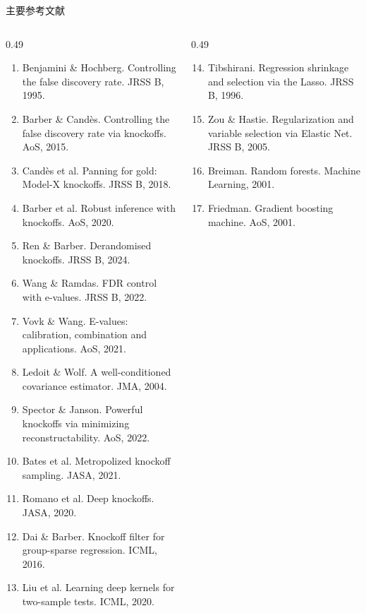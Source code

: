 \documentclass[aspectratio=169]{beamer}
\begin{document}
\begin{frame}[shrink=22]{主要参考文献}
  \tiny
  \begin{columns}[T]
    \begin{column}{0.49\textwidth}
      \begin{enumerate}
        \item Benjamini \& Hochberg. Controlling the false discovery rate. JRSS B, 1995.
        \item Barber \& Candès. Controlling the false discovery rate via knockoffs. AoS, 2015.
        \item Candès et al. Panning for gold: Model-X knockoffs. JRSS B, 2018.
        \item Barber et al. Robust inference with knockoffs. AoS, 2020.
        \item Ren \& Barber. Derandomised knockoffs. JRSS B, 2024.
        \item Wang \& Ramdas. FDR control with e-values. JRSS B, 2022.
        \item Vovk \& Wang. E-values: calibration, combination and applications. AoS, 2021.
        \item Ledoit \& Wolf. A well-conditioned covariance estimator. JMA, 2004.
        \item Spector \& Janson. Powerful knockoffs via minimizing reconstructability. AoS, 2022.
        \item Bates et al. Metropolized knockoff sampling. JASA, 2021.
        \item Romano et al. Deep knockoffs. JASA, 2020.
        \item Dai \& Barber. Knockoff filter for group-sparse regression. ICML, 2016.
        \item Liu et al. Learning deep kernels for two-sample tests. ICML, 2020.
      \end{enumerate}
    \end{column}
    \begin{column}{0.49\textwidth}
      \begin{enumerate}
        \setcounter{enumi}{13}
        \item Tibshirani. Regression shrinkage and selection via the Lasso. JRSS B, 1996.
        \item Zou \& Hastie. Regularization and variable selection via Elastic Net. JRSS B, 2005.
        \item Breiman. Random forests. Machine Learning, 2001.
        \item Friedman. Gradient boosting machine. AoS, 2001.

\end{enumerate}
\end{column}
\end{columns}
\end{frame}
\end{document}
